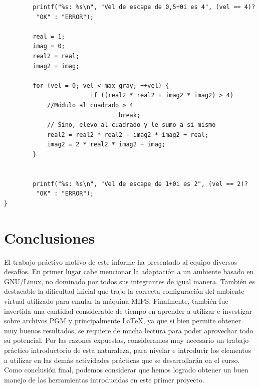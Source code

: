 \documentclass[a4paper,10pt]{article}
\begin{document}
\begin{verbatim}
        printf("%s: %s\n", "Vel de escape de 0,5+0i es 4", (vel == 4)?
         "OK" : "ERROR");
       
        real = 1;
        imag = 0;
        real2 = real;
        imag2 = imag;
       
        for (vel = 0; vel < max_gray; ++vel) {
                        if ((real2 * real2 + imag2 * imag2) > 4)
            //Módulo al cuadrado > 4
                                break;
            // Sino, elevo al cuadrado y le sumo a si mismo
            real2 = real2 * real2 - imag2 * imag2 + real;
            imag2 = 2 * real2 * imag2 + imag;
        }


        printf("%s: %s\n", "Vel de escape de 1+0i es 2", (vel == 2)?
         "OK" : "ERROR");
}

\end{verbatim}

\pagebreak



\section{Conclusiones}
El trabajo pr\'activo motivo de este informe ha presentado al equipo diversos desaf\'ios. En primer lugar cabe mencionar la adaptaci\'on a un ambiente basado en GNU/Linux, no dominado por todos sus integrantes de igual manera. Tambi\'en es destacable la dificultad inicial que trajo la correcta configuraci\'on del ambiente virtual utilizado para emular la m\'aquina MIPS. Finalmente, tambi\'en fue invertida una cantidad considerable de tiempo en aprender a utilizar e investigar sobre archivos PGM y principalmente \LaTeX{}, ya que si bien permite obtener muy buenos resultados, se requiere de mucha lectura para poder aprovechar todo su potencial.
Por las razones expuestas, consideramos muy necesario un trabajo pr\'actico introductorio de esta naturaleza, para nivelar e introducir los elementos a utilizar en las dem\'as actividades pr\'acticas que se desarrollar\'an en el curso.\\
Como conclusi\'on final, podemos considerar que hemos logrado obtener un buen manejo de las herramientas introducidas en este primer proyecto.

\pagebreak
\end{document}
